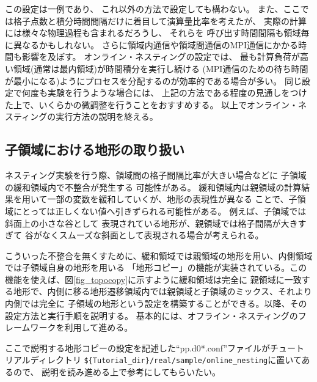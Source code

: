 この設定は一例であり、
これ以外の方法で設定しても構わない。
また、ここでは格子点数と積分時間間隔だけに着目して演算量比率を考えたが、
実際の計算には様々な物理過程も含まれるだろうし、
それらを 呼び出す時間間隔も領域毎に異なるかもしれない。
さらに領域内通信や領域間通信のMPI通信にかかる時間も影響を及ぼす。
オンライン・ネスティングの設定では、
最も計算負荷が高い領域(通常は最内領域)が時間積分を実行し続ける
(MPI通信のための待ち時間が最小になる)ようにプロセスを分配するのが効率的である場合が多い。
同じ設定で何度も実験を行うような場合には、
上記の方法である程度の見通しをつけた上で、いくらかの微調整を行うことをおすすめする。
以上でオンライン・ネスティングの実行方法の説明を終える。


\subsection{子領域における地形の取り扱い} \label{subsec:nest_topo}
ネスティング実験を行う際、領域間の格子間隔比率が大きい場合などに
子領域の緩和領域内で不整合が発生する
可能性がある。
緩和領域内は親領域の計算結果を用いて一部の変数を緩和していくが、地形の表現性が異なる
ことで、子領域にとっては正しくない値へ引きずられる可能性がある。
例えば、子領域では斜面上の小さな谷として
表現されている地形が、親領域では格子間隔が大きすぎて
谷がなくスムーズな斜面として表現される場合が考えられる。

こういった不整合を無くすために、緩和領域では親領域の地形を用い、内側領域では子領域自身の地形を用いる
「地形コピー」の機能が実装されている。この機能を使えば、図\ref{fig_topocopy}に示すように緩和領域は完全に
親領域に一致する地形で、内側に移る地形遷移領域内では親領域と子領域のミックス、それより内側では完全に
子領域の地形という設定を構築することができる。以降、その設定方法と実行手順を説明する。
基本的には、オフライン・ネスティングのフレームワークを利用して進める。


ここで説明する地形コピーの設定を記述した``pp.d0*.conf''ファイルがチュートリアルディレクトリ
\verb|${Tutorial_dir}/real/sample/online_nesting|に置いてあるので、
説明を読み進める上で参考にしてもらいたい。

